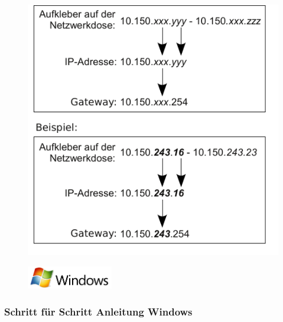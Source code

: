 \documentclass[a4paper,12pt]{scrartcl}
\begin{document}
\begin{figure}[h!]
		\centering
		\begin{minipage}[c]{0.45\linewidth}
			\centering
			\includegraphics[width=\linewidth,keepaspectratio]{Bilder/IP_Gerneric}
		\end{minipage}
	\end{figure}

\newpage
\enlargethispage{20pt}


\begin{figure}[h]
	\raggedleft
	\vspace{-20pt}
	\includegraphics[height=1cm,keepaspectratio]{Bilder/Windows_logo}
	\vspace{-30pt}
\end{figure}

\subsubsection*{Schritt für Schritt Anleitung Windows}
\end{document}
